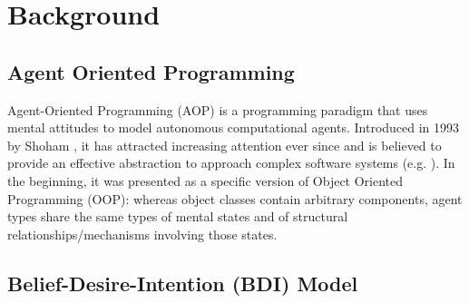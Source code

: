 \section{Background}
\label{sec:agere:background}
\subsection{Agent Oriented Programming}

Agent-Oriented Programming (AOP) is a programming paradigm that uses mental attitudes to model autonomous computational agents. Introduced in 1993 by Shoham \cite{shoham1993agent}, it has attracted increasing attention ever since and is believed to provide an effective abstraction to approach complex software systems (e.g. \cite{Sarl}). In the beginning, it was presented as a specific version of Object Oriented Programming (OOP): whereas object classes contain arbitrary components, agent types share the same types of mental states and of structural relationships/mechanisms involving those states. 


\subsection{Belief-Desire-Intention (BDI) Model}

